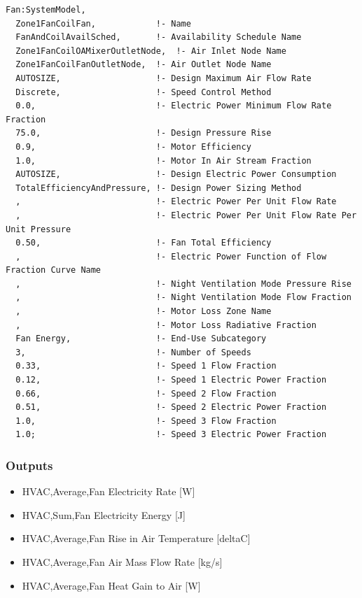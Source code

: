 \begin{lstlisting}
Fan:SystemModel,
  Zone1FanCoilFan,            !- Name
  FanAndCoilAvailSched,       !- Availability Schedule Name
  Zone1FanCoilOAMixerOutletNode,  !- Air Inlet Node Name
  Zone1FanCoilFanOutletNode,  !- Air Outlet Node Name
  AUTOSIZE,                   !- Design Maximum Air Flow Rate
  Discrete,                   !- Speed Control Method
  0.0,                        !- Electric Power Minimum Flow Rate Fraction
  75.0,                       !- Design Pressure Rise
  0.9,                        !- Motor Efficiency
  1.0,                        !- Motor In Air Stream Fraction
  AUTOSIZE,                   !- Design Electric Power Consumption
  TotalEfficiencyAndPressure, !- Design Power Sizing Method
  ,                           !- Electric Power Per Unit Flow Rate
  ,                           !- Electric Power Per Unit Flow Rate Per Unit Pressure
  0.50,                       !- Fan Total Efficiency
  ,                           !- Electric Power Function of Flow Fraction Curve Name
  ,                           !- Night Ventilation Mode Pressure Rise
  ,                           !- Night Ventilation Mode Flow Fraction
  ,                           !- Motor Loss Zone Name
  ,                           !- Motor Loss Radiative Fraction
  Fan Energy,                 !- End-Use Subcategory
  3,                          !- Number of Speeds
  0.33,                       !- Speed 1 Flow Fraction
  0.12,                       !- Speed 1 Electric Power Fraction
  0.66,                       !- Speed 2 Flow Fraction
  0.51,                       !- Speed 2 Electric Power Fraction
  1.0,                        !- Speed 3 Flow Fraction
  1.0;                        !- Speed 3 Electric Power Fraction
\end{lstlisting}

\subsubsection{Outputs}\label{outputs-fansysmodel}

\begin{itemize}
\item
  HVAC,Average,Fan Electricity Rate {[}W{]}
\item
  HVAC,Sum,Fan Electricity Energy {[}J{]}
\item
  HVAC,Average,Fan Rise in Air Temperature {[}deltaC{]}
\item
  HVAC,Average,Fan Air Mass Flow Rate {[}kg/s{]}
\item
  HVAC,Average,Fan Heat Gain to Air {[}W{]}
\end{itemize}

